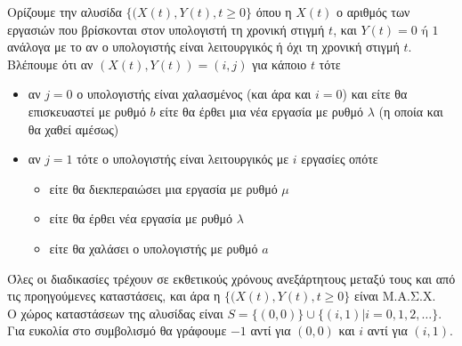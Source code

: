 \documentclass[a4paper,11pt]{article}
\newcommand{\mc}{Μ.Α.Σ.Χ. }
\begin{document}
Ορίζουμε την αλυσίδα $\{(X(t),Y(t),t\geq 0\}$ όπου η $X(t)$ ο αριθμός των εργασιών που βρίσκονται στον υπολογιστή τη χρονική στιγμή $t$, και $Y(t)=0 \text{ ή } 1$ ανάλογα με το αν ο υπολογιστής είναι λειτουργικός ή όχι τη χρονική στιγμή $t$.
\\[8pt]
Βλέπουμε ότι αν $(X(t),Y(t)) = (i,j)$ για κάποιο $t$ τότε
\begin{itemize}
	\item αν $j=0$ ο υπολογιστής είναι χαλασμένος (και άρα και $i=0$) και είτε θα επισκευαστεί με ρυθμό $b$ είτε θα έρθει μια νέα εργασία με ρυθμό $\lambda$ (η οποία και θα χαθεί αμέσως)
	\item αν $j=1$ τότε ο υπολογιστής είναι λειτουργικός με $i$ εργασίες οπότε
		\begin{itemize}
			\item είτε θα διεκπεραιώσει μια εργασία με ρυθμό $\mu$
			\item είτε θα έρθει νέα εργασία με ρυθμό $\lambda$
			\item είτε θα χαλάσει ο υπολογιστής με ρυθμό $a$
		\end{itemize}
\end{itemize}
Όλες οι διαδικασίες τρέχουν σε εκθετικούς χρόνους ανεξάρτητους μεταξύ τους και από τις προηγούμενες καταστάσεις, και άρα η $\{(X(t),Y(t),t\geq 0\}$ είναι \mc
\\[8pt]
Ο χώρος καταστάσεων της αλυσίδας είναι $S = \{(0,0)\} \cup \{(i,1)|i=0,1,2,\dots\}$.
Για ευκολία στο συμβολισμό θα γράφουμε $-1$ αντί για $(0,0)$ και $i$ αντί για $(i,1)$.
\begin{center}
\end{center}
\end{document}
